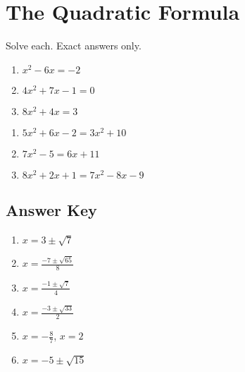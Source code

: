 \chapter{The Quadratic Formula}

Solve each. Exact answers only.

\begin{multicols}{3}
\begin{enumerate}
	\item $x^2-6x=-2$
	\item $4x^2 + 7x - 1 = 0$
    \item $8x^2 + 4x = 3$
\end{enumerate}	\setcounter{Review}{\value{enumi}}
\end{multicols}
\begin{multicols}{3}
\begin{enumerate}		\setcounter{enumi}{\value{Review}}
    \item $5x^2 + 6x - 2 = 3x^2 + 10$
    \item $7x^2-5 = 6x+11$
    \item $8x^2+2x+1=7x^2-8x-9$
\end{enumerate}	\setcounter{Review}{\value{enumi}}
\end{multicols}

\newpage

\section{Answer Key}

\begin{enumerate}
	\item $x = 3 \pm \sqrt{7}$
	\item $x = \frac{-7 \pm \sqrt{65}}{8}$
    \item $x = \frac{-1 \pm \sqrt{7}}{4}$
    \item $x = \frac{-3 \pm \sqrt{33}}{2}$
    \item $x = -\frac{8}{7}$, $x = 2$
    \item $x = -5 \pm \sqrt{15}$
\end{enumerate}